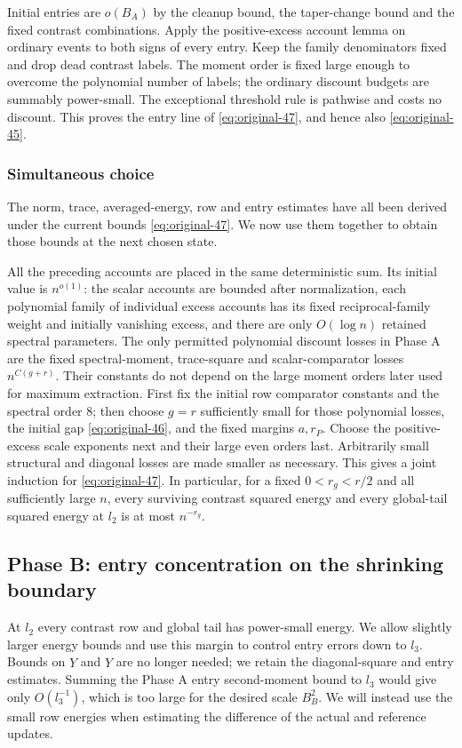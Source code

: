 Initial entries are $o(B_A)$ by the cleanup bound, the taper-change
bound and the fixed contrast combinations.
Apply the positive-excess account lemma on ordinary events to both
signs of every entry.  Keep the family denominators fixed and drop
dead contrast labels.  The moment order is fixed large enough to
overcome the polynomial number of labels; the ordinary discount
budgets are summably power-small.  The exceptional threshold rule
is pathwise and costs no discount.  This proves the entry line of
\eqref{eq:original-47}, and hence also
\eqref{eq:original-45}.

\subsubsection*{Simultaneous choice}
The norm, trace, averaged-energy, row and entry estimates have all been
derived under the current bounds \eqref{eq:original-47}.  We now use them
together to obtain those bounds at the next chosen state.

All the preceding accounts are placed in the same deterministic
sum.  Its initial value is $n^{o(1)}$: the scalar accounts are bounded
after normalization, each polynomial family of individual excess accounts
has its fixed reciprocal-family weight and initially vanishing excess,
and there are only $O(\log n)$ retained spectral parameters.
The only permitted polynomial discount losses in Phase A
are the fixed spectral-moment, trace-square and scalar-comparator
losses $n^{C(g+r)}$.  Their constants do not depend on the large
moment orders later used for maximum extraction.  First fix the
initial row comparator constants and the spectral order $8$;
then choose $g=r$ sufficiently small for those polynomial losses,
the initial gap \eqref{eq:original-46}, and the fixed margins
$a,r_P$.  Choose the positive-excess scale exponents next and their
large even orders last.  Arbitrarily small structural and diagonal
losses are made smaller as necessary.  This gives a joint induction
for \eqref{eq:original-47}.  In particular, for a fixed
$0<r_g<r/2$ and all sufficiently large $n$, every surviving
contrast squared energy and every global-tail squared energy at
$l_2$ is at most $n^{-r_g}$.

\subsection{Phase B: entry concentration on the shrinking boundary}
\label{subsec:boundary-phase-b}

At $l_2$ every contrast row and global tail has power-small energy.  We
allow slightly larger energy bounds and use this margin to control entry
errors down to $l_3$.  Bounds on $Y$ and $\widehat Y$ are no longer
needed; we retain the diagonal-square and entry estimates.  Summing the
Phase A entry second-moment bound to $l_3$ would give only $O(l_3^{-1})$,
which is too large for the desired scale $B_B^2$.  We will instead use
the small row energies when estimating the difference of the actual and
reference updates.

